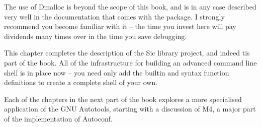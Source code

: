 The use of Dmalloc is beyond the scope of this book, and is in any case described very well in the documentation that comes with the package. I strongly recommend you become familiar with it -- the time you invest here will pay dividends many times over in the time you save debugging.

This chapter completes the description of the Sic library project, and indeed tis part of the book. All of the infrastructure for building an advanced command line shell is in place now -- you need only add the builtin and syntax function definitions to create a complete shell of your own.

Each of the chapters in the next part of the book explores a more specialised application of the GNU Autotools, starting with a discussion of M4, a major part of the implementation of Autoconf. 
 	
